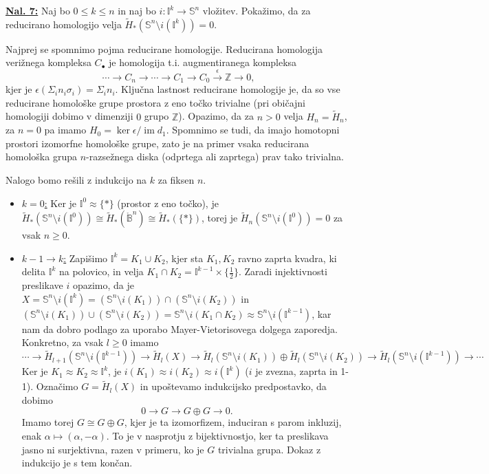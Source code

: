 \documentclass[a4paper, 12pt]{article}
\DeclareMathOperator{\im}{im}
\renewcommand{\S}{\mathbb{S}}
\newcommand{\B}{\mathbb{B}}
\newcommand{\Z}{\mathbb{Z}}
\newcommand{\I}{\mathbb{I}}
\newcommand{\iso}{\cong}
\newcommand{\homeo}{\approx}
\begin{document}
\underline{\textbf{Nal. 7:}}
Naj bo $0 \leq k \leq n$ in naj bo $i \colon \I^k \to \S^n$ vložitev. Pokažimo, da za reducirano homologijo velja $\widetilde{H}_*(\S^n \setminus i(\I^k)) = 0$.

Najprej se spomnimo pojma reducirane homologije. Reducirana homologija verižnega kompleksa $C_\bullet$ je homologija t.i. augmentiranega kompleksa
\[
\cdots \xrightarrow{} C_n \xrightarrow{} \cdots \xrightarrow{} C_1 \xrightarrow{} C_0 \xrightarrow{\epsilon} \Z \xrightarrow{} 0,
\]
kjer je $\epsilon (\Sigma_i n_i \sigma_i) = \Sigma_i n_i$. Ključna lastnost reducirane homologije je, da so vse reducirane homološke grupe prostora z eno točko trivialne (pri običajni homologiji dobimo v dimenziji $0$ grupo $\Z$). Opazimo, da za $n > 0$ velja $H_n = \widetilde{H}_n$, za $n = 0$ pa imamo $H_0 = \ker\epsilon / \im d_1$. Spomnimo se tudi, da imajo homotopni prostori izomorfne homološke grupe, zato je na primer vsaka reducirana homološka grupa $n$-razsežnega diska (odprtega ali zaprtega) prav tako trivialna.

Nalogo bomo rešili z indukcijo na $k$ za fiksen $n$.
\begin{itemize}
	\item \underline{$k=0$:} Ker je $\I^0 \homeo \lbrace * \rbrace$ (prostor z eno točko), je $\widetilde{H}_*(\S^n\setminus i(\I^0)) \iso \widetilde{H}_*(\mathring{\B}^n) \iso \widetilde{H}_*(\lbrace * \rbrace)$, torej je $\widetilde{H}_n(\S^n \setminus i(\I^0)) = 0$ za vsak $n \geq 0$.
	\item \underline{$k-1 \to k$:} Zapišimo $\I^k = K_1 \cup K_2$, kjer sta $K_1, K_2$ ravno zaprta kvadra, ki delita $\I^k$ na polovico, in velja $K_1 \cap K_2 = \I^{k-1}\times \lbrace \frac{1}{2} \rbrace$. Zaradi injektivnosti preslikave $i$ opazimo, da je $X = \S^n\setminus i(\I^k) = (\S^n \setminus i(K_1)) \cap (\S^n \setminus i(K_2))$ in $(\S^n \setminus i(K_1)) \cup (\S^n \setminus i(K_2)) = \S^n \setminus i(K_1 \cap K_2) \homeo \S^n \setminus i(\I^{k-1})$, kar nam da dobro podlago za uporabo Mayer-Vietorisovega dolgega zaporedja. Konkretno, za vsak $l \geq 0$ imamo
	\[
	\cdots \xrightarrow{} \widetilde{H}_{l+1}(\S^n \setminus i(\I^{k-1})) \xrightarrow{} \widetilde{H}_l(X) \xrightarrow{} \widetilde{H}_l(\S^n \setminus i(K_1)) \oplus \widetilde{H}_l(\S^n \setminus i(K_2)) \xrightarrow{} \widetilde{H}_l(\S^n \setminus i(\I^{k-1})) \xrightarrow{} \cdots
	\]
	Ker je $K_1 \homeo K_2 \homeo \I^k$, je $i(K_1) \homeo i(K_2) \homeo i(\I^k)$ ($i$ je zvezna, zaprta in 1-1). Označimo $G = \widetilde{H}_l(X)$ in upoštevamo indukcijsko predpostavko, da dobimo
	\[
	0 \xrightarrow{} G \xrightarrow{} G \oplus G \xrightarrow{} 0.
	\]
	Imamo torej $G \iso G \oplus G$, kjer je ta izomorfizem, induciran s parom inkluzij, enak $\alpha \mapsto (\alpha, -\alpha)$. To je v nasprotju z bijektivnostjo, ker ta preslikava jasno ni surjektivna, razen v primeru, ko je $G$ trivialna grupa. Dokaz z indukcijo je s tem končan.
\end{itemize}
\end{document}
